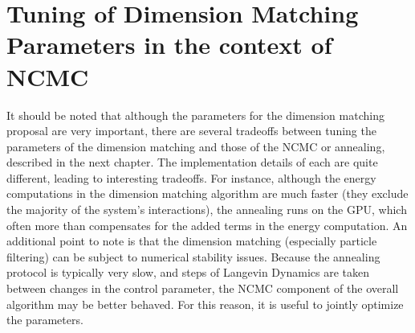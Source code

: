 \section{Tuning of Dimension Matching Parameters in the context of NCMC}
%
It should be noted that although the parameters for the dimension matching proposal are very important, there are several tradeoffs between tuning the parameters of the dimension matching and those of the NCMC or annealing, described in the next chapter.
%
The implementation details of each are quite different, leading to interesting tradeoffs.
%
For instance, although the energy computations in the dimension matching algorithm are much faster (they exclude the majority of the system's interactions), the annealing runs on the GPU, which often more than compensates for the added terms in the energy computation.
%
An additional point to note is that the dimension matching (especially particle filtering) can be subject to numerical stability issues.
%
Because the annealing protocol is typically very slow, and steps of Langevin Dynamics are taken between changes in the control parameter, the NCMC component of the overall algorithm may be better behaved.
%
For this reason, it is useful to jointly optimize the parameters.
%
